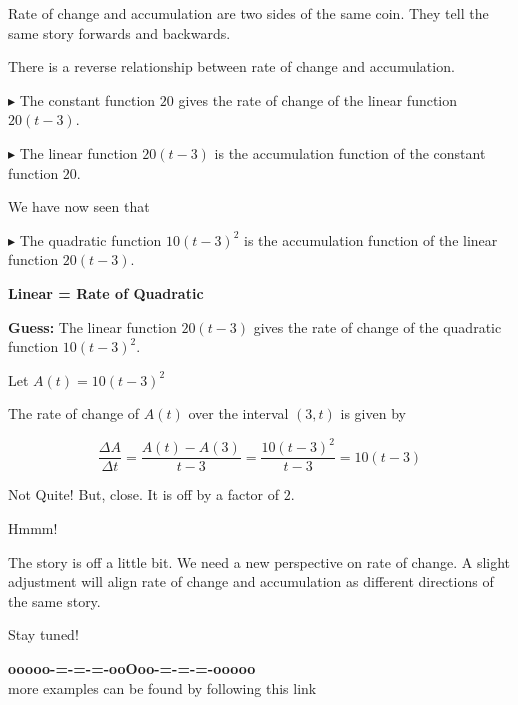 \documentclass{ximera}
\begin{document}
Rate of change and accumulation are two sides of the same coin.  They tell the same story forwards and backwards.



There is a reverse relationship between rate of change and accumulation.


$\blacktriangleright$ The constant function $20$ gives the rate of change of the linear function $20(t-3)$.


$\blacktriangleright$ The linear function $20(t-3)$ is the accumulation function of the constant function $20$.




We have now seen that 

$\blacktriangleright$ The quadratic function $10(t-3)^2$ is the accumulation function of the linear function $20(t-3)$. 





\begin{idea} \textbf{\textcolor{blue!55!black}{Linear = Rate of Quadratic}} 


\textbf{\textcolor{blue!55!black}{Guess:}} The linear function $20(t-3)$ gives the rate of change of the quadratic function $10(t-3)^2$.





Let $A(t) = 10 (t-3)^2$


The rate of change of $A(t)$ over the interval $(3, t)$ is given by




\[
\frac{\Delta A}{\Delta t} = \frac{A(t) - A(3)}{t-3} = \frac{10 (t-3)^2}{t-3} = 10(t-3)
\]


Not Quite!  But, close.  It is off by a factor of $2$.  




Hmmm!


\end{idea}













The story is off a little bit. We need a new perspective on rate of change.  A slight adjustment will align rate of change and accumulation as different directions of the same story. 

Stay tuned!










\begin{center}
\textbf{\textcolor{green!50!black}{ooooo-=-=-=-ooOoo-=-=-=-ooooo}} \\

more examples can be found by following this link\\ 

\end{center}
\end{document}
